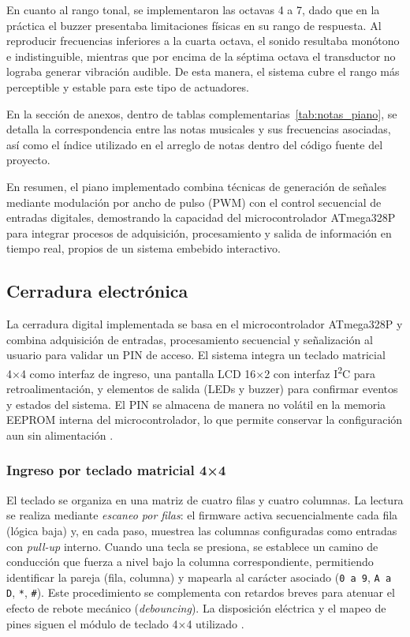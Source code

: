 En cuanto al rango tonal, se implementaron las octavas 4 a 7, dado que en la práctica el buzzer presentaba limitaciones físicas en su rango de respuesta. 
Al reproducir frecuencias inferiores a la cuarta octava, el sonido resultaba monótono e indistinguible, mientras que por encima de la séptima octava el transductor no lograba generar vibración audible. 
De esta manera, el sistema cubre el rango más perceptible y estable para este tipo de actuadores.

En la sección de anexos, dentro de tablas complementarias~\ref{tab:notas_piano}, 
se detalla la correspondencia entre las notas musicales y sus frecuencias asociadas, 
así como el índice utilizado en el arreglo de notas dentro del código fuente del proyecto.

En resumen, el piano implementado combina técnicas de generación de señales mediante modulación por ancho de pulso (PWM) con el control secuencial de entradas digitales, demostrando la capacidad del microcontrolador ATmega328P para integrar procesos de adquisición, procesamiento y salida de información en tiempo real, propios de un sistema embebido interactivo.

\subsection{Cerradura electrónica}

La cerradura digital implementada se basa en el microcontrolador ATmega328P y combina adquisición de entradas, procesamiento secuencial y señalización al usuario para validar un PIN de acceso. El sistema integra un teclado matricial 4×4 como interfaz de ingreso, una pantalla LCD 16×2 con interfaz I\textsuperscript{2}C para retroalimentación, y elementos de salida (LEDs y buzzer) para confirmar eventos y estados del sistema. El PIN se almacena de manera no volátil en la memoria EEPROM interna del microcontrolador, lo que permite conservar la configuración aun sin alimentación \cite{atmega328p_datasheet}.

\subsubsection{Ingreso por teclado matricial 4×4}
El teclado se organiza en una matriz de cuatro filas y cuatro columnas. La lectura se realiza mediante \textit{escaneo por filas}: el firmware activa secuencialmente cada fila (lógica baja) y, en cada paso, muestrea las columnas configuradas como entradas con \textit{pull-up} interno. Cuando una tecla se presiona, se establece un camino de conducción que fuerza a nivel bajo la columna correspondiente, permitiendo identificar la pareja (fila, columna) y mapearla al carácter asociado (\texttt{0 a 9}, \texttt{A a D}, \texttt{*}, \texttt{\#}). Este procedimiento se complementa con retardos breves para atenuar el efecto de rebote mecánico (\textit{debouncing}). La disposición eléctrica y el mapeo de pines siguen el módulo de teclado 4×4 utilizado \cite{keypad_4x4_okystar}.

